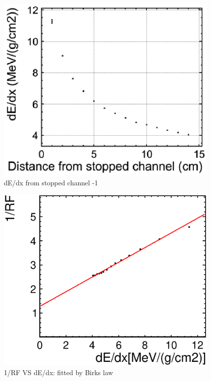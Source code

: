 \begin{figure}[!htb]
  \centering
  \centering
  \includegraphics[width=11cm,clip]{./fig/dedx.eps}
  \caption{dE/dx from stopped channel -1}
  \label{fadcDistdEdx}
\end{figure}

\begin{figure}[!htb]
  \centering
  \centering
  \includegraphics[width=11cm,clip]{./fig/result.eps}
  \caption{1/RF VS dE/dx: fitted by Birks law}
  \label{result}
\end{figure}

